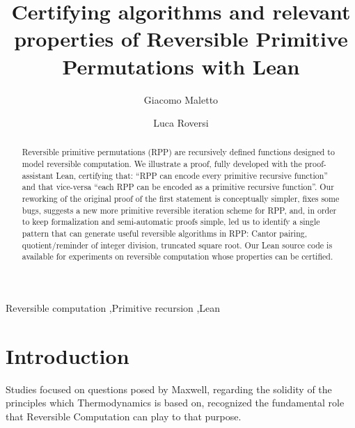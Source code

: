\documentclass[preprint]{elsarticle}
\theoremstyle{remark}
\newcommand{\RPP}{\textsf{RPP}\xspace}
\newcommand{\LEAN}{\textsf{Lean}\xspace}
\begin{document}
\begin{frontmatter}

\title{Certifying algorithms and relevant properties of Reversible Primitive Permutations with \LEAN}


\author[1]{Giacomo Maletto}

\author[2]{Luca Roversi}



\begin{abstract}
Reversible primitive permutations (\RPP) are recursively defined functions designed to model reversible computation. We illustrate a proof, fully developed with the proof-assistant Lean, certifying that: ``\RPP can encode every primitive recursive function'' and that vice-versa ``each \RPP can be encoded as a primitive recursive function''. Our reworking of the original proof of the first statement is conceptually simpler, fixes some bugs, suggests a new more primitive reversible iteration scheme for \RPP, and, in order to keep formalization and semi-automatic proofs simple, led us to identify a single pattern that can generate useful reversible algorithms in \RPP: Cantor pairing, quotient/reminder of integer division, truncated square root. Our Lean source code is available for experiments on reversible computation whose properties can be certified.
\end{abstract}

\begin{keyword}
    Reversible computation \sep Primitive recursion \sep Lean
\end{keyword}

\end{frontmatter}

\section{Introduction}
\label{section:Introduction}
Studies focused on questions posed by Maxwell, regarding the solidity of the principles which Thermodynamics is based on, recognized the fundamental role that Reversible Computation can play to that purpose.
\end{document}
